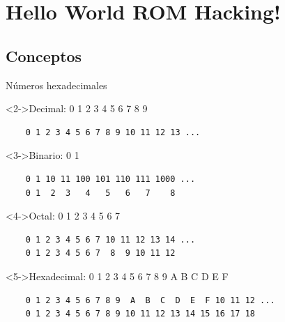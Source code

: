 \section{Hello World ROM Hacking!}
\subsection{Conceptos}
\begin{frame}[fragile]{Números hexadecimales}
    \begin{uncoverenv}<2->Decimal: 0 1 2 3 4 5 6 7 8 9
    \begin{lstlisting}
    0 1 2 3 4 5 6 7 8 9 10 11 12 13 ...\end{lstlisting}\end{uncoverenv}

    \begin{uncoverenv}<3->Binario: 0 1
    \begin{lstlisting}
    0 1 10 11 100 101 110 111 1000 ...
    0 1  2  3   4   5   6   7    8\end{lstlisting}\end{uncoverenv}

    \begin{uncoverenv}<4->Octal: 0 1 2 3 4 5 6 7
    \begin{lstlisting}
    0 1 2 3 4 5 6 7 10 11 12 13 14 ...
    0 1 2 3 4 5 6 7  8  9 10 11 12\end{lstlisting}\end{uncoverenv}

    \begin{uncoverenv}<5->Hexadecimal: 0 1 2 3 4 5 6 7 8 9 A B C D E F
    \begin{lstlisting}
    0 1 2 3 4 5 6 7 8 9  A  B  C  D  E  F 10 11 12 ...
    0 1 2 3 4 5 6 7 8 9 10 11 12 13 14 15 16 17 18\end{lstlisting}\end{uncoverenv}
\end{frame}

